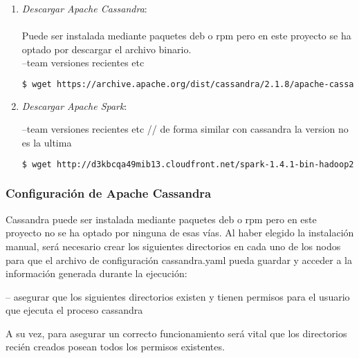 \begin{enumerate}
\item \textit{Descargar Apache Cassandra}:\\\\Puede ser instalada mediante paquetes deb o rpm pero en este proyecto se ha optado por descargar el archivo binario.\\



--team versiones recientes etc

\begin{lstlisting}[language=bash]
$ wget https://archive.apache.org/dist/cassandra/2.1.8/apache-cassandra-2.1.8-bin.tar.gz
\end{lstlisting}

\item \textit{Descargar Apache Spark}:

--team versiones recientes etc // de forma similar con cassandra la version no es la ultima

\begin{lstlisting}[language=bash]
$ wget http://d3kbcqa49mib13.cloudfront.net/spark-1.4.1-bin-hadoop2.6.tgz
\end{lstlisting}
	
\end{enumerate}

\subsubsection{Configuración de Apache Cassandra}

Cassandra puede ser instalada mediante paquetes deb o rpm pero en este proyecto no se ha optado por ninguna de esas vías. Al haber elegido la instalación manual, será necesario crear los siguientes directorios en cada uno de los nodos para que el archivo de configuración cassandra.yaml pueda guardar y acceder a la información generada durante la ejecución:

-- asegurar que los siguientes directorios existen y tienen permisos para el usuario que ejecuta el proceso cassandra



A su vez, para asegurar un correcto funcionamiento será vital que los directorios recién creados posean todos los permisos existentes. 

